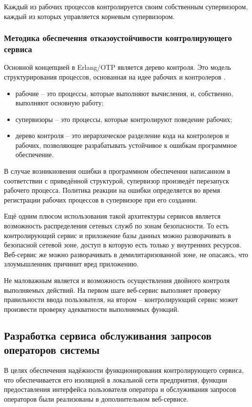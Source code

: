 Каждый из рабочих процессов контролируется своим собственным супервизором, каждый из которых управляется
корневым супервизором.


\subsubsection{Методика обеспечения отказоустойчивости контролирующего сервиса}
Основной концепцией в Erlang/OTP является дерево контроля. Это модель структурирования процессов,
основанная на идее рабочих и контролеров \cite{otpOv}.

\begin{itemize}
	\item рабочие -- это процессы, которые выполняют вычисления, и, собственно, выполняют основную работу;
	\item супервизоры -- это процессы, которые контролируют поведение рабочих;
	\item дерево контроля -- это иерархическое разделение кода на контролеров и рабочих,
		позволяющее разрабатывать устойчивое к ошибкам программное обеспечение.
\end{itemize}

В случае возникновения ошибки в программном обеспечении написанном в соответствии с приведённой структурой,
супервизор произведёт перезапуск рабочего процесса. Политика реакции на ошибки определяется во время регистрации
рабочих процессов в супервизоре при его создании.

Ещё одним плюсом использования такой архитектуры сервисов является возможность распределения
сетевых служб по зонам безопасности. То есть контролирующий сервис и приложение базы данных можно разворачивать
в безопасной сетевой зоне, доступ в которую есть только у внутренних ресурсов. Веб-сервис же можно разворачивать
в демилитаризованной зоне, не опасаясь, что злоумышленник причинит вред приложению.

Не маловажным является и возможность осуществления двойного контроля выполняемых действий. На первом шаге
веб-сервис выполняет проверку правильности ввода пользователя, на втором -- контролирующий сервис
может произвести проверку адекватности выполняемых функций.


\subsection{Разработка сервиса обслуживания запросов операторов системы}
В целях обеспечения надёжности функционирования контролирующего сервиса, что обеспечивается его
 изоляцией в локальной сети предприятия, функции предоставления интерфейса пользователя оператора
и обслуживания запросов операторов были реализованы в дополнительном веб-сервисе.


